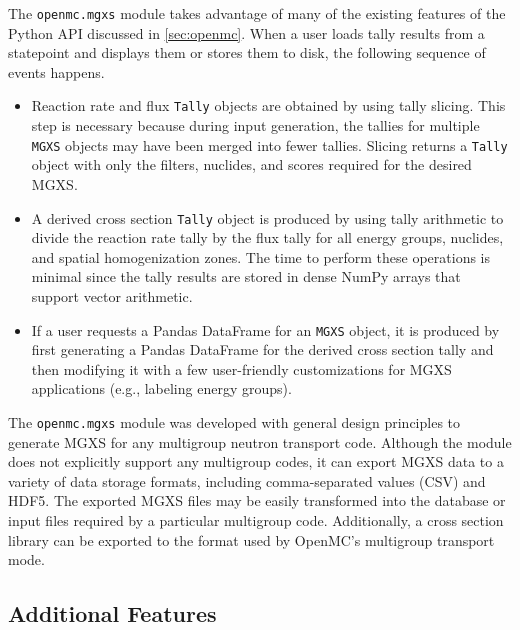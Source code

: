 The \texttt{openmc.mgxs} module takes advantage of many of the existing features of the Python API discussed in \cref{sec:openmc}. When a user loads tally results from a statepoint and displays them or stores them to disk, the following sequence of events happens.

\begin{itemize}[noitemsep]
\item Reaction rate and flux \texttt{Tally} objects are obtained by using tally slicing. This step is necessary because during input generation, the tallies for multiple \texttt{MGXS} objects may have been merged into fewer tallies. Slicing returns a \texttt{Tally} object with only the filters, nuclides, and scores required for the desired MGXS.
\item A derived cross section \texttt{Tally} object is produced by using tally arithmetic to divide the reaction rate tally by the flux tally for all energy groups, nuclides, and spatial homogenization zones. The time to perform these operations is minimal since the tally results are stored in dense NumPy arrays that support vector arithmetic.
\item If a user requests a Pandas DataFrame for an \texttt{MGXS} object, it is produced by first generating a Pandas DataFrame for the derived cross section tally and then modifying it with a few user-friendly customizations for MGXS applications (\textrm{e.g.}, labeling energy groups).
\end{itemize}

The \texttt{openmc.mgxs} module was developed with general design principles to generate MGXS for any multigroup neutron transport code. Although the module does not explicitly support any multigroup codes, it can export MGXS data to a variety of data storage formats, including comma-separated values (CSV) and HDF5. The exported MGXS files may be easily transformed into the database or input files required by a particular multigroup code. Additionally, a cross section library can be exported to the format used by OpenMC's multigroup transport mode.

\subsection{Additional Features}
\label{sec:features}


